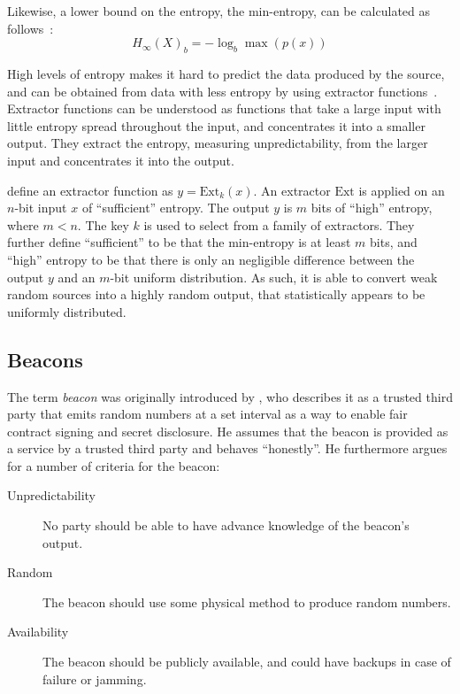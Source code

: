 Likewise, a lower bound on the entropy, the min-entropy, can be calculated as follows~\cite{informationtheory}:
$$
H_\infty(X)_{b} = -\log_{b}\max(p(x))
$$

High levels of entropy makes it hard to predict the data produced by the source, and can be obtained from data with less entropy by using extractor functions~\cite{pseudorandomness}. Extractor functions can be understood as functions that take a large input with little entropy spread throughout the input, and concentrates it into a smaller output. They extract the entropy, measuring unpredictability, from the larger input and concentrates it into the output.

\citet{bonneau2015bitcoin} define an extractor function as $y = \text{Ext}_k(x)$.
An extractor $\text{Ext}$ is applied on an $n$-bit input $x$ of \enquote{sufficient} entropy.
The output $y$ is $m$ bits of \enquote{high} entropy, where $m < n$. The key $k$ is used to select from a family of extractors.
They further define \enquote{sufficient} to be that the min-entropy is at least $m$ bits, and \enquote{high} entropy to be that there is only an negligible difference between the output $y$ and an $m$-bit uniform distribution.
As such, it is able to convert weak random sources into a highly random output, that statistically appears to be uniformly distributed.

\subsection{Beacons}

The term \emph{beacon} was originally introduced by \citet{rabin1983transaction}, who describes it as a trusted third party that emits random numbers at a set interval as a way to enable fair contract signing and secret disclosure.
He assumes that the beacon is provided as a service by a trusted third party and behaves \enquote{honestly}.
He furthermore argues for a number of criteria for the beacon:

\begin{description}
    \item[Unpredictability] No party should be able to have advance knowledge of the beacon's output.
    \item[Random] The beacon should use some physical method to produce random numbers.
    \item[Availability] The beacon should be publicly available, and could have backups in case of failure or jamming.
\end{description}

